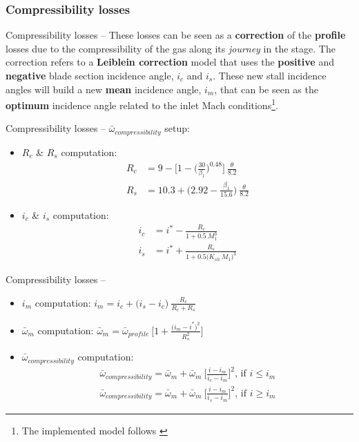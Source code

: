 \subsubsection{Compressibility losses}
	\begin{frame}{Compressibility losses -- }
		 These losses can be seen as a \textbf{correction} of the \textbf{profile} losses due to the compressibility of the gas along its \textit{journey} in the stage. 
		 \newline
		 \newline
		 The correction refers to a \textbf{Leiblein correction} model that uses the \textbf{positive} and \textbf{negative} blade section incidence angle, $i_c$ and $i_s$. 
		 \newline
		 \newline
		 These new stall incidence angles will build a new \textbf{mean} incidence angle, $i_m$, that can be seen as the \textbf{optimum} incidence angle related to the inlet Mach conditions\footnote{The implemented model follows \cite[Sec. 6.6]{axial2004}}. 
	\end{frame}
	\begin{frame}{Compressibility losses -- }
		$\bar{\omega}_{compressibility}$ setup:
		\begin{itemize}
			\item $R_c$ \& $R_s$ computation:
				\begin{align}
					R_c & = 9 - \Bigg[1 - \Bigg( \frac{30}{\beta_1} \Bigg)^{0.48} \Bigg] \ \frac{\theta}{8.2} \nonumber \\
					R_s & = 10.3 + \Bigg( 2.92 - \frac{\beta_1}{15.6} \Bigg) \ \frac{\theta}{8.2} \nonumber  
				\end{align}
			\item $i_c$ \& $i_s$ computation:
				\begin{align}
					i_c & = i^{*} - \frac{R_c}{1 + 0.5 \ M_{1}^{3}} \nonumber \\
					i_s & = i^{*} + \frac{R_s}{1 + 0.5 \Big( K_{sh} \ M_{1} \Big)^3} \nonumber 
				\end{align}
		\end{itemize}
	\end{frame}
	\begin{frame}{Compressibility losses -- }
		\begin{itemize}
			\item $i_m$ computation: $i_m = i_c + \Big( i_s - i_c \Big) \ \frac{R_c}{R_c + R_s}$
			\item $\bar{\omega}_{m}$ computation: $\bar{\omega}_{m} = \bar{\omega}_{profile} \ \Bigg[ 1 + \frac{\big( i_m - i^{*} \big)^2}{R_s^{2}} \Bigg]$
			\item $\bar{\omega}_{compressibility}$ computation: 
				\begin{align}
					\bar{\omega}_{compressibility} = \bar{\omega}_m + \bar{\omega}_m \ \Bigg[ \frac{i - i_m}{i_c - i_m} \Bigg]^2 \text{, if } i \leq i_m\nonumber \\ 
					\bar{\omega}_{compressibility} = \bar{\omega}_m + \bar{\omega}_m \ \Bigg[ \frac{i - i_m}{i_s - i_m} \Bigg]^2 \text{, if } i \geq i_m \nonumber 
				\end{align}
		\end{itemize}
	\end{frame}
